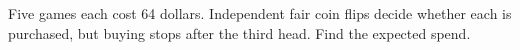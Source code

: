 Five games each cost 64 dollars. Independent fair coin flips decide whether each is purchased, but buying stops after the third head. Find the expected spend.
